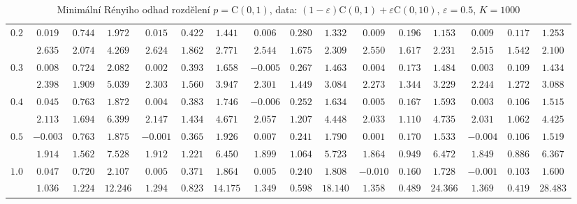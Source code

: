 \begin{table}[ht]
\begin{center}
\begin{tabular}{|c|ccc|ccc|ccc|ccc|ccc|}
\hline 
$0.2$ & $ 0.019 $ & $ 0.744 $ & $ 1.972 $ & $ 0.015 $ & $ 0.422 $ & $ 1.441 $ & $ 0.006 $ & $ 0.280 $ & $ 1.332 $ & $ 0.009 $ & $ 0.196 $ & $ 1.153 $ & $ 0.009 $ & $ 0.117 $ & $ 1.253 $\\ 
 & $ 2.635 $ & $ 2.074 $ & $ 4.269 $ & $ 2.624 $ & $ 1.862 $ & $ 2.771 $ & $ 2.544 $ & $ 1.675 $ & $ 2.309 $ & $ 2.550 $ & $ 1.617 $ & $ 2.231 $ & $ 2.515 $ & $ 1.542 $ & $ 2.100 $\\ 
\hline 
$0.3$ & $ 0.008 $ & $ 0.724 $ & $ 2.082 $ & $ 0.002 $ & $ 0.393 $ & $ 1.658 $ & $ -0.005 $ & $ 0.267 $ & $ 1.463 $ & $ 0.004 $ & $ 0.173 $ & $ 1.484 $ & $ 0.003 $ & $ 0.109 $ & $ 1.434 $\\ 
 & $ 2.398 $ & $ 1.909 $ & $ 5.039 $ & $ 2.303 $ & $ 1.560 $ & $ 3.947 $ & $ 2.301 $ & $ 1.449 $ & $ 3.084 $ & $ 2.273 $ & $ 1.344 $ & $ 3.229 $ & $ 2.244 $ & $ 1.272 $ & $ 3.088 $\\ 
\hline 
$0.4$ & $ 0.045 $ & $ 0.763 $ & $ 1.872 $ & $ 0.004 $ & $ 0.383 $ & $ 1.746 $ & $ -0.006 $ & $ 0.252 $ & $ 1.634 $ & $ 0.005 $ & $ 0.167 $ & $ 1.593 $ & $ 0.003 $ & $ 0.106 $ & $ 1.515 $\\ 
 & $ 2.113 $ & $ 1.694 $ & $ 6.399 $ & $ 2.147 $ & $ 1.434 $ & $ 4.671 $ & $ 2.057 $ & $ 1.207 $ & $ 4.448 $ & $ 2.033 $ & $ 1.110 $ & $ 4.735 $ & $ 2.031 $ & $ 1.062 $ & $ 4.425 $\\ 
\hline 
$0.5$ & $ -0.003 $ & $ 0.763 $ & $ 1.875 $ & $ -0.001 $ & $ 0.365 $ & $ 1.926 $ & $ 0.007 $ & $ 0.241 $ & $ 1.790 $ & $ 0.001 $ & $ 0.170 $ & $ 1.533 $ & $ -0.004 $ & $ 0.106 $ & $ 1.519 $\\ 
 & $ 1.914 $ & $ 1.562 $ & $ 7.528 $ & $ 1.912 $ & $ 1.221 $ & $ 6.450 $ & $ 1.899 $ & $ 1.064 $ & $ 5.723 $ & $ 1.864 $ & $ 0.949 $ & $ 6.472 $ & $ 1.849 $ & $ 0.886 $ & $ 6.367 $\\ 
\hline 
$1.0$ & $ 0.047 $ & $ 0.720 $ & $ 2.107 $ & $ 0.005 $ & $ 0.371 $ & $ 1.864 $ & $ 0.005 $ & $ 0.240 $ & $ 1.808 $ & $ -0.010 $ & $ 0.160 $ & $ 1.728 $ & $ -0.001 $ & $ 0.103 $ & $ 1.600 $\\ 
 & $ 1.036 $ & $ 1.224 $ & $ 12.246 $ & $ 1.294 $ & $ 0.823 $ & $ 14.175 $ & $ 1.349 $ & $ 0.598 $ & $ 18.140 $ & $ 1.358 $ & $ 0.489 $ & $ 24.366 $ & $ 1.369 $ & $ 0.419 $ & $ 28.483 $\\ 
\hline 
\end{tabular}
\caption{Minimální Rényiho odhad rozdělení $p = \mathrm{C}(0,1)$, data: $(1-\varepsilon)\mathrm{C}(0,1) + \varepsilon \mathrm{C}(0,10)$, $\varepsilon =  0.5$, $K = 1000$} 
\label{tab:MDE6}
\end{center}
\end{table}

%
